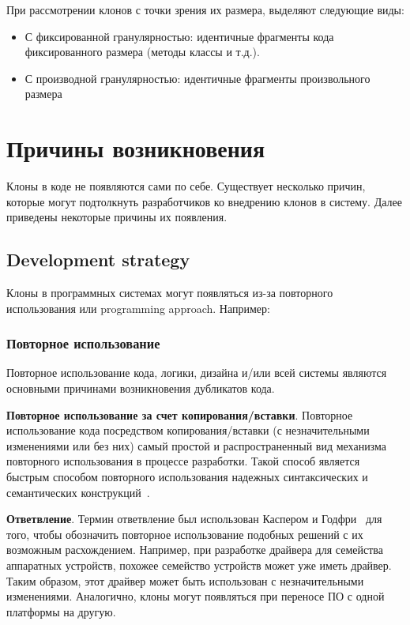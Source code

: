 При рассмотрении клонов с точки зрения их размера, выделяют следующие виды:
\begin{itemize}
\setlength\itemsep{0mm}
\item С фиксированной гранулярностью: идентичные фрагменты кода фиксированного размера (методы классы и т.д.).
\item С производной гранулярностью: идентичные фрагменты произвольного размера
\end{itemize}


\section{Причины возникновения}

Клоны в коде не появляются сами по себе. Существует несколько причин, которые могут подтолкнуть разработчиков ко внедрению клонов в систему. Далее приведены некоторые причины их появления.

\subsection{Development strategy}

Клоны в программных системах могут появляться из-за повторного использования или programming approach. Например:

\subsubsection{Повторное использование}

Повторное использование кода, логики, дизайна и/или всей системы являются основными причинами возникновения дубликатов кода.

\textbf{Повторное использование за счет копирования/вставки}. Повторное использование кода посредством копирования/вставки (с незначительными изменениями или без них) самый простой и распространенный вид механизма повторного использования в процессе разработки. Такой способ является быстрым способом повторного использования надежных синтаксических и семантических конструкций~\cite{copypaste}.

\textbf{Ответвление}. Термин ответвление был использован Каспером и Годфри~\cite{forking} для того, чтобы обозначить повторное использование подобных решений с их возможным расхождением. Например, при разработке драйвера для семейства аппаратных устройств, похожее семейство устройств может уже иметь драйвер. Таким образом, этот драйвер может быть использован с незначительными изменениями. Аналогично, клоны могут появляться при переносе ПО с одной платформы на другую. 

